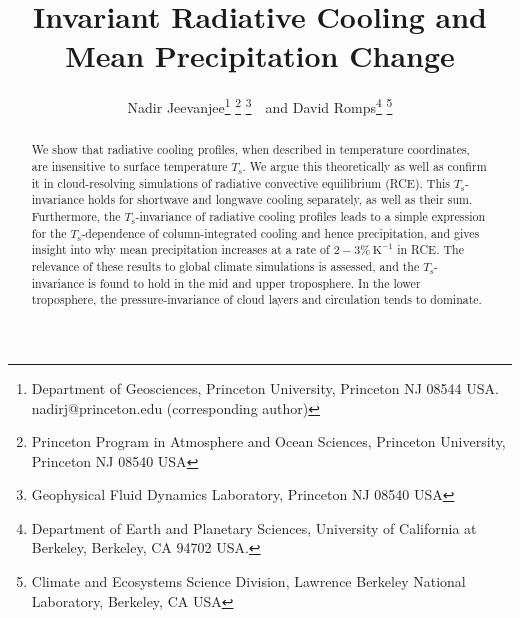 \documentclass[10pt]{article}
\newcommand{\Ts}{\ensuremath{T_\mathrm{s}}}
\newcommand{\Kinverse}{\ensuremath{\mathrm{K^{-1}}}}
\begin{document}
%
%


\title{Invariant Radiative Cooling and Mean Precipitation Change}

%
%


 \author{Nadir Jeevanjee\footnote{Department of Geosciences, Princeton University, Princeton NJ 08544 USA. nadirj@princeton.edu (corresponding author)} \footnote{Princeton Program in Atmosphere and Ocean Sciences, Princeton University, Princeton NJ 08540 USA} \footnote{Geophysical Fluid Dynamics Laboratory,  Princeton NJ  08540 USA}\ \    and David Romps\footnote{Department of Earth and Planetary Sciences, University of California at Berkeley, Berkeley, CA 94702  USA.} \footnote{Climate and Ecosystems Science Division, Lawrence Berkeley National Laboratory, Berkeley, CA USA}
}

\maketitle

\begin{abstract}
We show that radiative cooling profiles, when described in temperature coordinates, are insensitive to surface temperature \Ts. We argue this theoretically as well as confirm it in cloud-resolving simulations of radiative convective equilibrium (RCE). This \Ts-invariance holds for shortwave and longwave cooling separately, as well as their sum. Furthermore, the \Ts-invariance of radiative cooling profiles leads to a simple expression for the \Ts-dependence of column-integrated cooling and hence precipitation, and gives insight into why mean precipitation increases at a rate of $2 -3\%\ \Kinverse$ in RCE.  The relevance of these results to global climate simulations is assessed, and the \Ts-invariance is found to hold in the mid and upper troposphere.  In the lower troposphere, the pressure-invariance of cloud layers and circulation tends to dominate.
%
%
\end{abstract}


%
%
\end{document}
